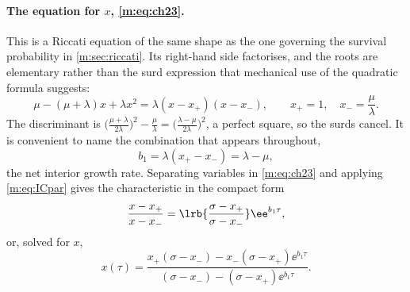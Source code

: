 \paragraph{The equation for $x$, \eqref{m:eq:ch23}.}
This is a Riccati equation of the same shape as the one governing the survival
probability in \cref{m:sec:riccati}. Its right-hand side factorises, and the roots
are elementary rather than the surd expression that mechanical use of the quadratic
formula suggests:
\begin{equation}
\label{m:eq:xpm}
\mu-(\mu+\lambda)x+\lambda x^2 = \lambda(x-x_+)(x-x_-),
\qquad
x_+ = 1,\quad x_- = \frac{\mu}{\lambda} .
\end{equation}
The discriminant is
$\bigl(\tfrac{\mu+\lambda}{2\lambda}\bigr)^2 - \tfrac{\mu}{\lambda}
= \bigl(\tfrac{\lambda-\mu}{2\lambda}\bigr)^2$, a perfect square, so the surds
cancel. It is convenient to name the combination that appears throughout,
\begin{equation}
\label{m:eq:b1}
b_1 = \lambda(x_+-x_-) = \lambda-\mu ,
\end{equation}
the net interior growth rate. Separating variables in \cref{m:eq:ch23} and applying
\cref{m:eq:ICpar} gives the characteristic in the compact form
\begin{equation}
\label{m:eq:xratio}
\frac{x-x_+}{x-x_-} = \lrb{\frac{\sigma-x_+}{\sigma-x_-}}\ee^{b_1\tau},
\end{equation}
or, solved for $x$,
\begin{equation}
\label{m:eq:xabd}
x(\tau) = \frac{x_+(\sigma-x_-) - x_-(\sigma-x_+)\ee^{b_1\tau}}
{(\sigma-x_-) - (\sigma-x_+)\ee^{b_1\tau}} .
\end{equation}

